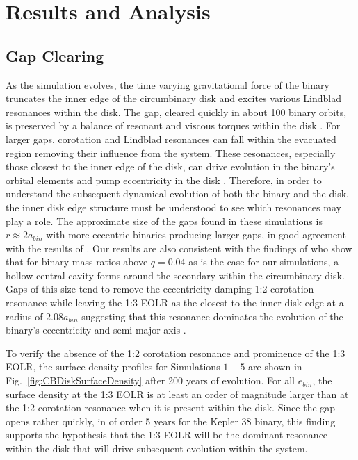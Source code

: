 \section{Results and Analysis}


\subsection{Gap Clearing} \label{CBDisk:sec:GapClearing}

As the simulation evolves, the time varying gravitational force of the
binary truncates the inner edge of the circumbinary disk and excites
various Lindblad resonances within the disk.  The gap, cleared quickly
in about 100 binary orbits, is preserved by a balance of resonant and
viscous torques within the disk \citep{Artymowicz1994}.  For larger gaps,
corotation and Lindblad resonances can fall within the evacuated
region removing their influence from the system.  These resonances,
especially those closest to the inner edge of the disk, can drive
evolution in the binary's orbital elements \citep{Goldreich1980,Artymowicz1991} and
pump eccentricity in the disk \citep{Papaloizou2001}.  Therefore, in
order to understand the subsequent dynamical evolution of both the
binary and the disk, the inner disk edge structure must be understood to see which
resonances may play a role.  The approximate size of the gaps found in
these simulations is $r \approx 2 a_{bin}$ with more eccentric binaries
producing larger gaps, in good agreement with the results of
\citet{Artymowicz1994}.  Our results are also consistent with the findings of \citet{DOrazio2016} who show that for binary mass ratios above $q = 0.04$ as is the case 
for our simulations, a hollow central cavity forms around the secondary within the circumbinary disk.  Gaps of this size tend to remove the eccentricity-damping 
1:2 corotation resonance while leaving the 1:3 EOLR as the closest to the inner disk edge at a radius of $2.08 a_{bin}$ suggesting that this resonance 
dominates the evolution of the binary's eccentricity and semi-major axis \citep{Artymowicz1991,Artymowicz1992,Papaloizou2001}.

To verify the absence of the 1:2 corotation resonance and prominence
of the 1:3 EOLR, the surface density profiles for Simulations $1-5$
are shown in Fig.~\ref{fig:CBDiskSurfaceDensity} after 200 years of evolution.
For all $e_{bin}$, the surface density at the 1:3 EOLR is at least an
order of magnitude larger than at the 1:2 corotation resonance when it
is present within the disk.  Since the gap opens rather quickly, in of order 5 years for the Kepler 38 binary,  this finding supports the hypothesis that the 1:3 EOLR will be the dominant resonance within the disk that will drive subsequent evolution within the system.


